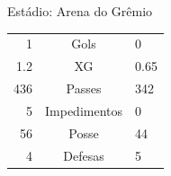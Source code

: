 \documentclass[11pt]{article}
\begin{document}
\begin{minipage}{0.65\textwidth}
\begin{center}
\begin{tabular}{rl}
\end{tabular}
\end{center}
\end{minipage}
\begin{minipage}{0.3\textwidth}
Estádio: Arena do Grêmio\\
\begin{tabular}{rcl}
1 & Gols & 0 \\
1.2 & XG & 0.65 \\
436 & Passes & 342 \\
5 & Impedimentos & 0 \\
56 & Posse & 44 \\
4 & Defesas & 5 \\
\end{tabular}
\end{minipage}
\newpage
\end{document}
